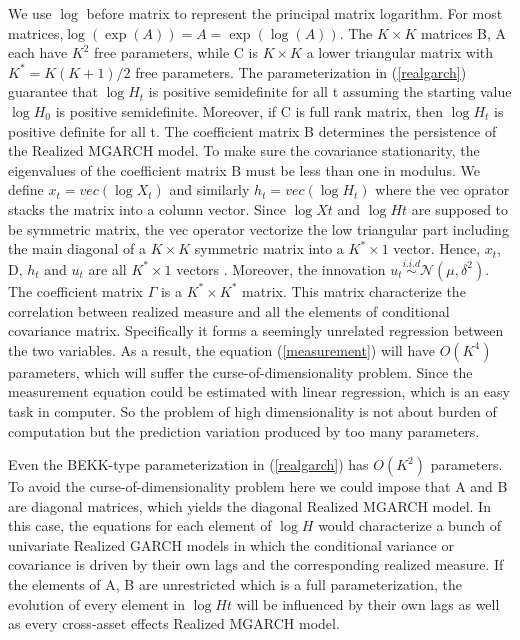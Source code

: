 \documentclass[titlepage,11pt]{article}
\begin{document}
We use $\log$ before matrix to represent the principal matrix logarithm. For most matrices,$\log (\exp(A)) = A =\exp(\log(A))$.  The $K \times K$ matrices B, A each have $K^2$ free parameters, while C is $K \times K$ a lower triangular matrix with $K^*= K(K+1)/2$ free parameters. The parameterization in (\ref{realgarch}) guarantee that $\log H_t$ is positive semidefinite for all t assuming the starting value $\log H_0$ is positive semidefinite. Moreover, if C is full rank matrix, then $\log H_t$ is positive definite for all t. The coefficient matrix B determines the persistence of the Realized MGARCH model. To make sure the covariance stationarity, the eigenvalues of the coefficient matrix B must be less than one in modulus.
 We define $x_t = vec(\log X_t)$ and similarly $h_t = vec(\log H_t)$ where the vec oprator stacks the matrix into a column vector. 
Since $\log Xt$ and $\log Ht$ are supposed to be symmetric matrix, the vec operator vectorize the low triangular part including the main diagonal of a $K \times K$ symmetric matrix into a $K^* \times 1$ vector. Hence, $x_t$, D, $h_t$ and $u_t$ are all  $K^* \times 1$ vectors . Moreover, the innovation $u_t \overset{i.i.d} {\sim} \mathcal{N}(\mu,\delta^2)$. The coefficient matrix $\Gamma$ is a $K^* \times K^*$ matrix.  This matrix characterize the correlation between realized measure and all the elements of conditional covariance matrix. Specifically it forms a seemingly unrelated regression between the two variables. As a result, the equation (\ref{measurement}) will have $O(K^4)$ parameters, which will suffer the curse-of-dimensionality problem. Since the measurement equation could be estimated with linear regression, which is an easy task in computer. So the problem of high dimensionality is not about  burden of computation but the prediction variation produced by too many parameters.

Even the BEKK-type parameterization in (\ref{realgarch}) has $O(K^2)$ parameters. To avoid the curse-of-dimensionality problem here we could impose that A and B are diagonal matrices, which yields the diagonal Realized MGARCH model. In this case, the equations for each element of $\log H$ would characterize a bunch of univariate Realized GARCH models in which the conditional variance or covariance is driven by their own lags and the corresponding realized measure. If the elements of A, B are unrestricted which is a full parameterization, the evolution of every element in $\log Ht$ will be influenced by their own lags as well as every cross-asset effects Realized MGARCH model. 
\end{document}
